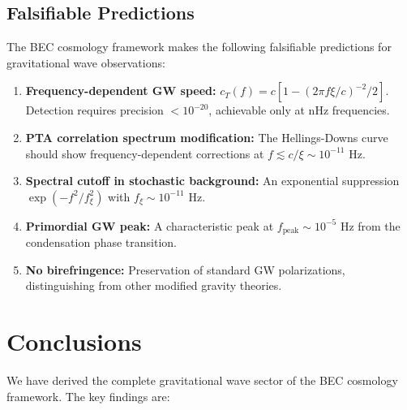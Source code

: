\documentclass[11pt,a4paper]{article}
\newcommand{\cT}{\ensuremath{c_T}}
\theoremstyle{definition}
\theoremstyle{remark}
\begin{document}
\subsection{Falsifiable Predictions}

The BEC cosmology framework makes the following falsifiable predictions for gravitational wave observations:

\begin{enumerate}[label=\arabic*.]
\item \textbf{Frequency-dependent GW speed:} $\cT(f) = c[1 - (2\pi f\xi/c)^{-2}/2]$. Detection requires precision $<10^{-20}$, achievable only at nHz frequencies.

\item \textbf{PTA correlation spectrum modification:} The Hellings-Downs curve should show frequency-dependent corrections at $f \lesssim c/\xi \sim 10^{-11}$ Hz.

\item \textbf{Spectral cutoff in stochastic background:} An exponential suppression $\exp(-f^2/f_\xi^2)$ with $f_\xi \sim 10^{-11}$ Hz.

\item \textbf{Primordial GW peak:} A characteristic peak at $f_{\mathrm{peak}} \sim 10^{-5}$ Hz from the condensation phase transition.

\item \textbf{No birefringence:} Preservation of standard GW polarizations, distinguishing from other modified gravity theories.
\end{enumerate}

\section{Conclusions}
\label{sec:conclusions}

We have derived the complete gravitational wave sector of the BEC cosmology framework. The key findings are:
\end{document}
